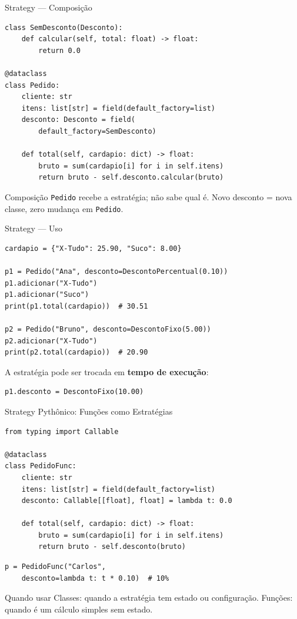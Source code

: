\documentclass[aspectratio=169]{beamer}
\begin{document}
\begin{frame}[fragile]{Strategy --- Composição}
\begin{lstlisting}
class SemDesconto(Desconto):
    def calcular(self, total: float) -> float:
        return 0.0

@dataclass
class Pedido:
    cliente: str
    itens: list[str] = field(default_factory=list)
    desconto: Desconto = field(
        default_factory=SemDesconto)

    def total(self, cardapio: dict) -> float:
        bruto = sum(cardapio[i] for i in self.itens)
        return bruto - self.desconto.calcular(bruto)
\end{lstlisting}

\begin{exampleblock}{Composição}
\texttt{Pedido} recebe a estratégia; não sabe qual é. Novo desconto = nova classe, zero mudança em \texttt{Pedido}.
\end{exampleblock}
\end{frame}

\begin{frame}[fragile]{Strategy --- Uso}
\begin{lstlisting}
cardapio = {"X-Tudo": 25.90, "Suco": 8.00}

p1 = Pedido("Ana", desconto=DescontoPercentual(0.10))
p1.adicionar("X-Tudo")
p1.adicionar("Suco")
print(p1.total(cardapio))  # 30.51

p2 = Pedido("Bruno", desconto=DescontoFixo(5.00))
p2.adicionar("X-Tudo")
print(p2.total(cardapio))  # 20.90
\end{lstlisting}

A estratégia pode ser trocada em \textbf{tempo de execução}:
\begin{lstlisting}
p1.desconto = DescontoFixo(10.00)
\end{lstlisting}
\end{frame}

\begin{frame}[fragile]{Strategy Pythônico: Funções como Estratégias}
\begin{lstlisting}
from typing import Callable

@dataclass
class PedidoFunc:
    cliente: str
    itens: list[str] = field(default_factory=list)
    desconto: Callable[[float], float] = lambda t: 0.0

    def total(self, cardapio: dict) -> float:
        bruto = sum(cardapio[i] for i in self.itens)
        return bruto - self.desconto(bruto)
\end{lstlisting}

\begin{lstlisting}
p = PedidoFunc("Carlos",
    desconto=lambda t: t * 0.10)  # 10%
\end{lstlisting}

\begin{exampleblock}{Quando usar}
Classes: quando a estratégia tem estado ou configuração.
Funções: quando é um cálculo simples sem estado.
\end{exampleblock}
\end{frame}
\end{document}
